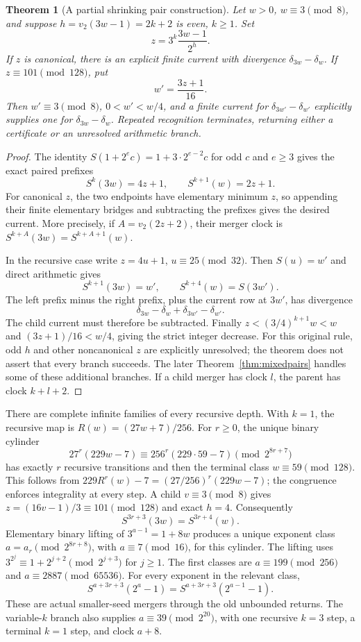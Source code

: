 \documentclass[11pt]{article}
\newtheorem{theorem}{Theorem}
\begin{document}
\begin{theorem}[A partial shrinking pair construction]\label{thm:pairedreturn}
Let $w>0$, $w\equiv3\pmod8$, and suppose
$h=v_2(3w-1)=2k+2$ is even, $k\ge1$. Set
\[
z=3^k\frac{3w-1}{2^h}.
\]
If $z$ is canonical, there is an explicit finite current with divergence
$\delta_{3w}-\delta_w$. If $z\equiv101\pmod{128}$, put
\[
w'=\frac{3z+1}{16}.
\]
Then $w'\equiv3\pmod8$, $0<w'<w/4$, and a finite current for
$\delta_{3w'}-\delta_{w'}$ explicitly supplies one for
$\delta_{3w}-\delta_w$. Repeated recognition terminates, returning
either a certificate or an unresolved arithmetic branch.
\end{theorem}
\begin{proof}
The identity $S(1+2^e c)=1+3\cdot2^{e-2}c$ for odd $c$ and
$e\ge3$ gives the exact paired prefixes
\[
S^k(3w)=4z+1,\qquad S^{k+1}(w)=2z+1.
\]
For canonical $z$, the two endpoints have elementary minimum $z$,
so appending their finite elementary bridges and subtracting the
prefixes gives the desired current. More precisely, if
$A=v_2(2z+2)$, their merger clock is
$S^{k+A}(3w)=S^{k+A+1}(w)$.

In the recursive case write $z=4u+1$, $u\equiv25\pmod{32}$.
Then $S(u)=w'$ and direct arithmetic gives
\[
S^{k+1}(3w)=w',\qquad S^{k+4}(w)=S(3w').
\]
The left prefix minus the right prefix, plus the current row at $3w'$,
has divergence
\[
\delta_{3w}-\delta_w+\delta_{3w'}-\delta_{w'}.
\]
The child current must therefore be subtracted. Finally
$z<(3/4)^{k+1}w<w$ and $(3z+1)/16<w/4$, giving the strict
integer decrease. For this original rule, odd $h$ and other noncanonical
$z$ are explicitly unresolved; the theorem does not assert that every
branch succeeds. The later Theorem~\ref{thm:mixedpairs} handles some
of these additional branches.
If a child merger has clock $l$, the parent has clock $k+l+2$.
\end{proof}

There are complete infinite families of every recursive depth. With
$k=1$, the recursive map is $R(w)=(27w+7)/256$. For $r\ge0$, the
unique binary cylinder
\[
27^r(229w-7)\equiv256^r(229\cdot59-7)
\pmod{2^{8r+7}}
\]
has exactly $r$ recursive transitions and then the terminal class
$w\equiv59\pmod{128}$. This follows from
$229R^r(w)-7=(27/256)^r(229w-7)$; the congruence enforces integrality
at every step. A child $v\equiv3\pmod8$ gives
$z=(16v-1)/3\equiv101\pmod{128}$ and exact $h=4$.
Consequently
\[
S^{3r+3}(3w)=S^{3r+4}(w).
\]
Elementary binary lifting of $3^{a-1}=1+8w$ produces a unique exponent
class $a=a_r\pmod{2^{8r+8}}$, with $a\equiv7\pmod{16}$,
for this cylinder. The lifting uses
$3^{2^j}\equiv1+2^{j+2}\pmod{2^{j+3}}$ for $j\ge1$.
The first classes are $a\equiv199\pmod{256}$ and
$a\equiv2887\pmod{65536}$. For every exponent in the relevant class,
\[
S^{a+3r+3}(2^a-1)=S^{a+3r+3}(2^{a-1}-1).
\]
These are actual smaller-seed mergers through the old unbounded returns.
The variable-$k$ branch also supplies $a\equiv39\pmod{2^{20}}$,
with one recursive $k=3$ step, a terminal $k=1$ step, and clock $a+8$.
\end{document}
